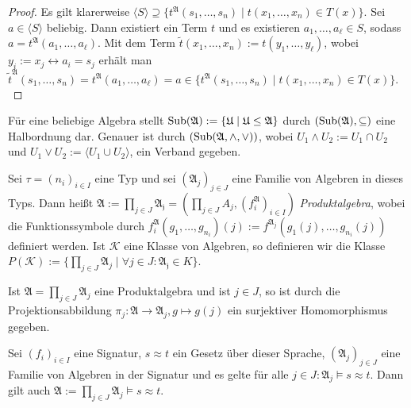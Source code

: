 \begin{proof}
    Es gilt klarerweise $\langle S\rangle\supseteq \{t^\mathfrak{A}(s_1,\ldots,s_n)\mid t(x_1,\ldots,x_n)\in T(x)\}$.
    Sei $a\in\langle S\rangle$ beliebig. Dann existiert ein Term $t$ und es existieren $a_1,\ldots,a_\ell\in S$,
    sodass $a=t^\mathfrak{A}(a_1,\ldots,a_\ell)$. Mit dem Term $\tilde{t}(x_1,\ldots,x_n):=t(y_1,\ldots,y_\ell)$, wobei $y_i:=x_j\leftrightarrow a_i=s_j$
    erhält man $\tilde{t}^\mathfrak{A}(s_1,\ldots,s_n)=t^\mathfrak{A}(a_1,\ldots,a_\ell)=a\in\{t^\mathfrak{A}(s_1,\ldots,s_n)\mid t(x_1,\ldots,x_n)\in T(x)\}.$
\end{proof}

\begin{remark}
    Für eine beliebige Algebra stellt $\operatorname{Sub}(\mathfrak{A}):=\{\mathfrak{U}\mid \mathfrak{U}\le \mathfrak{A}\}$ durch
    $(\operatorname{Sub}(\mathfrak{A}),\subseteq)$ eine Halbordnung dar. Genauer ist durch $(\operatorname{Sub}(\mathfrak{A},\land,\lor))$,
    wobei $U_1\land U_2:=U_1\cap U_2$ und $U_1\lor U_2:=\langle U_1\cup U_2\rangle$, ein Verband gegeben.
\end{remark}

\begin{definition}
    Sei $\tau = (n_i)_{i\in I}$ eine Typ und sei $(\mathfrak{A}_j)_{j\in J}$ eine Familie von Algebren in dieses Typs.
    Dann heißt $\mathfrak{A}:=\prod_{j\in J}\mathfrak{A_j}=(\prod_{j\in J}A_j,(f^\mathfrak{A}_i)_{i\in I})$ \emph{Produktalgebra},
    wobei die Funktionssymbole durch $f^\mathfrak{A}_i(g_1,\ldots,g_{n_i})(j):=f^{\mathfrak{A}_j}(g_1(j),\ldots,g_{n_i}(j))$
    definiert werden. Ist $\mathcal{K}$ eine Klasse von Algebren, so definieren wir die Klasse $P(\mathcal{K}):=\{\prod_{j\in J}\mathfrak{A}_j\mid \forall j\in J:\mathfrak{A_j}\in K\}$.
\end{definition}

\begin{remark}
    Ist $\mathfrak{A}=\prod_{j\in J}\mathfrak{A}_j$ eine Produktalgebra und ist $j\in J$, so ist durch die Projektionsabbildung
    $\pi_j:\mathfrak{A}\to \mathfrak{A}_j, g\mapsto g(j)$ ein surjektiver Homomorphismus gegeben.
\end{remark}

\begin{proposition}
    Sei $(f_i)_{i\in I}$ eine Signatur, $s\approx t$ ein Gesetz über dieser Sprache, $(\mathfrak{A}_j)_{j\in J}$
    eine Familie von Algebren in der Signatur und es gelte für alle $j\in J:\mathfrak{A}_j\models s\approx t$.
    Dann gilt auch $\mathfrak{A}:=\prod_{j\in J}\mathfrak{A}_j\models s\approx t$.
\end{proposition}

